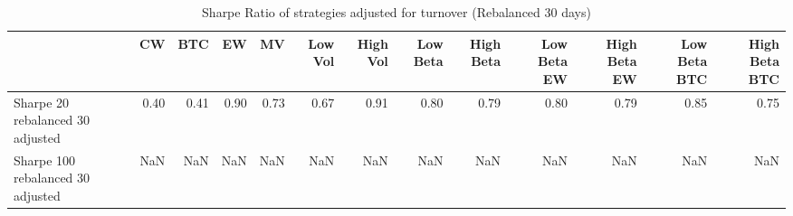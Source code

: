 \begin{table}
\centering
\caption{Sharpe Ratio of strategies adjusted for turnover (Rebalanced 30 days)}
\label{sharpe30}
\begin{tabular}{lrrrrrrrrrrrr}
\toprule
{} &   CW &  BTC &   EW &   MV &  Low Vol &  High Vol &  Low Beta &  High Beta &  Low Beta EW &  High Beta EW &  Low Beta BTC &  High Beta BTC \\
\midrule
Sharpe 20 rebalanced 30 adjusted  & 0.40 & 0.41 & 0.90 & 0.73 &     0.67 &      0.91 &      0.80 &       0.79 &         0.80 &          0.79 &          0.85 &           0.75 \\
Sharpe 100 rebalanced 30 adjusted &  NaN &  NaN &  NaN &  NaN &      NaN &       NaN &       NaN &        NaN &          NaN &           NaN &           NaN &            NaN \\
\bottomrule
\end{tabular}
\end{table}
